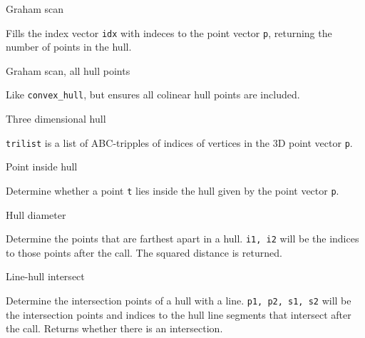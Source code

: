 
\begin{algorithm}{Graham scan}

Fills the index vector {\tt idx} with indeces to the point vector {\tt p},
returning the number of points in the hull.
\end{algorithm}

\begin{algorithm}{Graham scan, all hull points}

Like {\tt convex\_hull}, but ensures all colinear hull points are included.
\end{algorithm}

\begin{algorithm}{Three dimensional hull}


{\tt trilist} is a list of ABC-tripples of indices of vertices in the 3D
point vector {\tt p}.
\end{algorithm}

\begin{algorithm}{Point inside hull}

Determine whether a point {\tt t} lies inside the hull given by the
point vector {\tt p}.
\end{algorithm}

\begin{algorithm}{Hull diameter}

Determine the points that are farthest apart in a hull.
{\tt i1, i2} will be the indices to those points after the call.
The squared distance is returned.
\end{algorithm}

\begin{algorithm}{Line-hull intersect}

Determine the intersection points of a hull with a line.
{\tt p1, p2, s1, s2} will be the intersection points and indices to the hull
line segments that intersect after the call. Returns whether there is an
intersection.
\end{algorithm}
